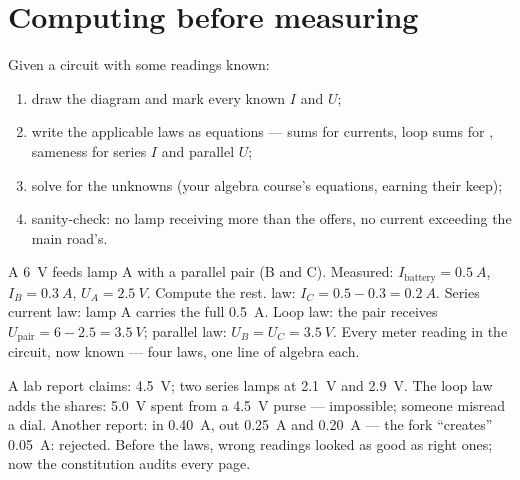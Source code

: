 \section{Computing before measuring}

\begin{method}\label{met:g8:circuit-laws:solve}
Given a circuit with some readings known:
\begin{enumerate}
  \item draw the diagram and mark every known $I$ and $U$;
  \item write the applicable laws as equations --- 
        sums for currents, loop sums for , sameness
        for series $I$ and parallel $U$;
  \item solve for the unknowns (your algebra course's
        equations, earning their keep);
  \item sanity-check: no lamp receiving more than the 
        offers, no  current exceeding the main road's.
\end{enumerate}
\end{method}

\begin{example}\label{ex:g8:circuit-laws:worked}
A \qty{6}{V}  feeds lamp A  with a parallel
pair (B and C). Measured: $I_{\text{battery}} = \qty{0.5}{A}$,
$I_B = \qty{0.3}{A}$, $U_A = \qty{2.5}{V}$. Compute the rest.
 law: $I_C = 0.5 - 0.3 = \qty{0.2}{A}$. Series current
law: lamp A carries the full \qty{0.5}{A}. Loop  law:
the pair receives $U_{\text{pair}} = 6 - 2.5 = \qty{3.5}{V}$;
parallel  law: $U_B = U_C = \qty{3.5}{V}$. Every meter
reading in the circuit, now known --- four laws, one line of
algebra each.
\end{example}

\begin{example}\label{ex:g8:circuit-laws:liedetector}
A lab report claims:  \qty{4.5}{V}; two series lamps at
\qty{2.1}{V} and \qty{2.9}{V}. The loop law adds the shares:
\qty{5.0}{V} spent from a \qty{4.5}{V} purse --- impossible;
someone misread a dial. Another report:  in
\qty{0.40}{A},  out \qty{0.25}{A} and \qty{0.20}{A}
--- the fork ``creates'' \qty{0.05}{A}: rejected. Before the
laws, wrong readings looked as good as right ones; now the
constitution audits every page.
\end{example}

